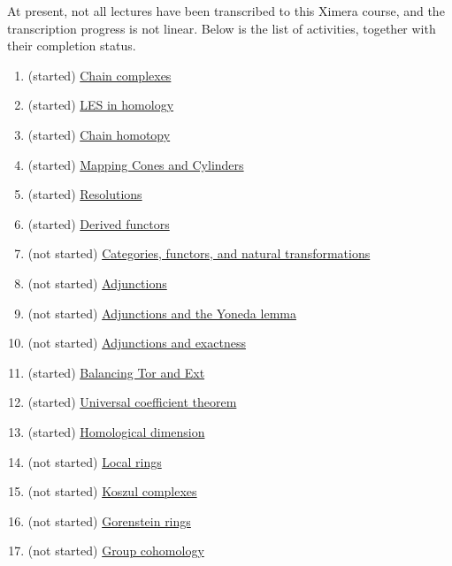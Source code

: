 \documentclass{ximera}
\begin{document}
At present, not all lectures have been transcribed to this Ximera
course, and the transcription progress is not linear.  Below is the
list of activities, together with their completion status.

\begin{enumerate}
\item (started) \href{/activity/chainComplexes/chainComplexes/}{Chain complexes}
\item (started) \href{/activity/lesInHomology/lesInHomology/}{LES in homology}
\item (started) \href{/activity/chainHomotopy/chainHomotopy/}{Chain homotopy}
\item (started) \href{/activity/mappingConesAndCylinders/mappingConesAndCylinders/}{Mapping Cones and Cylinders}
\item (started) \href{/activity/resolutions/resolutions/}{Resolutions}
\item (started) \href{/activity/derivedFunctors/derivedFunctors/}{Derived functors}
\item (not started) \href{/activity/categoriesFunctorsAndNaturalTransformations/categoriesFunctorsAndNaturalTransformations/}{Categories, functors, and natural transformations}
\item (not started) \href{/activity/adjunctions/adjunctions/}{Adjunctions}
\item (not started) \href{/activity/adjunctionsAndTheYonedaLemma/adjunctionsAndTheYonedaLemma/}{Adjunctions and the Yoneda lemma}
\item (not started) \href{/activity/adjunctionsAndExactness/adjunctionsAndExactness/}{Adjunctions and exactness}
\item (started) \href{/activity/balancingTorAndExt/balancingTorAndExt/}{Balancing Tor and Ext}
\item (started) \href{/activity/universalCoefficientTheorem/universalCoefficientTheorem/}{Universal coefficient theorem}
\item (started) \href{/activity/homologicalDimension/homologicalDimension/}{Homological dimension}
\item (not started) \href{/activity/localRings/localRings/}{Local rings}
\item (not started) \href{/activity/koszulComplexes/koszulComplexes/}{Koszul complexes}
\item (not started) \href{/activity/gorensteinRings/gorensteinRings/}{Gorenstein rings}
\item (not started) \href{/activity/groupCohomology/groupCohomology/}{Group cohomology}

\end{enumerate}
\end{document}
